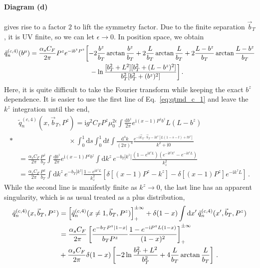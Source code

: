 \documentclass[11pt,a4paper]{article}
\DeclareRobustCommand{\eq}[1]{Eq.~\eqref{eq:#1}}
\newcommand{\df}{\mathrm{d}}
\newcommand{\img}{\mathrm{i}}
\newcommand{\eps}{\epsilon}
\newcommand{\nn}{\nonumber}
\newcommand{\as}{\alpha_s}
\newcommand{\bt}{\vec b_T}
\newcommand{\kt}{\vec k_T}
\newcommand{\plusinf}{_+^{\pm\infty}}
\begin{document}
\paragraph{Diagram (d)} gives rise to a factor $2$ to lift the symmetry factor.
Due to the finite separation $\bt$, it is UV finite, so we can let $\eps\to0$.
In position space, we obtain
\begin{align} \label{eq:qtmd_c_6}
 \tilde q_n^{(c,4)}(b^\mu) &
 = \frac{\as C_F}{2\pi} P^z e^{-\img b^z P^z}
   \biggl[ - 2\frac{b^z}{b_T} \arctan\frac{b^z}{b_T}
   + 2\frac{L}{b_T} \arctan\frac{L}{b_T}
   + 2 \frac{L - b^z}{b_T} \arctan\frac{L-b^z}{b_T}
   \nn\\&\hspace{3.2cm}
   - \ln\frac{[b_T^2 + L^2] [ b_T^2 + (L - b^z)^2]}{b_T^2 [b_T^2 + (b^z)^2]}
   \biggr]
\,.\end{align}
Here, it is quite difficult to take the Fourier transform while keeping the exact $b^z$ dependence.
It is easier to use the first line of \eq{qtmd_c_1} and leave the $k^z$ integration until the end,
\begin{align} \label{eq:qtmd_c_7}
 &\tilde q_n^{(c,4)}(x, \bt, P^z)
 = \img g^2 C_F P^z \mu_0^{2\eps} \int\frac{\df b^z}{2\pi} e^{\img (x-1)P^z b^z} L (L-b^z)
   \nn\\*&\hspace{3cm}\times
   \int_0^1 \df s \int_0^1 \df t \int\frac{\df^4 k}{(2\pi)^4}
   \frac{e^{-\img \kt \cdot \bt - \img k^z [L(1-s-t) + t b^z]}}{k^2 + \img 0}
\nn\\&
 = \frac{\as C_F}{2\pi} \frac{P^z}{b_T} \int\frac{\df b^z}{2\pi} e^{\img (x-1)P^z b^z}
   \int\df k^z \, e^{-b_T |k^z|} \frac{(1 - e^{\img k^z L})(e^{-\img b^z k^z} - e^{-\img k^z L})}{k_z^2}
\nn\\&
 = \frac{\as C_F}{2\pi} \frac{P^z}{b_T}
   \int\df k^z \, e^{-b_T |k^z|} \frac{1 - e^{\img k^z L}}{k_z^2}
   \left[ \delta[(x-1)P^z - k^z] - \delta[(x-1)P^z] e^{-\img k^z L} \right]
\,.\end{align}
While the second line is manifestly finite as $k^z\to0$, the last line has an apparent singularity,
which is as usual treated as a plus distribution,
\begin{align} \label{eq:qtmd_c_8}
 \tilde q_n^{(c,4)}(x, \bt, P^z) &
 = \Bigl[ \tilde q_n^{(c,4)}(x \ne 1, \bt, P^z) \Bigr]\plusinf
  + \delta(1-x) \int\df x'\,\tilde q_n^{(c,4)}(x', \bt, P^z)
\nn\\&
 = \frac{\as C_F}{2\pi} \left[ \frac{e^{-b_T P^z |1-x|}}{b_T P^z}
   \frac{1 - e^{- \img P^z L (1-x)}}{(1-x)^2} \right]\plusinf
   \nn\\&
 + \frac{\as C_F}{2\pi} \delta(1-x) \left[- 2 \ln\frac{b_T^2 + L^2}{b_T^2}
   + 4 \frac{L}{b_T} \arctan\frac{L}{b_T} \right]
\,.\end{align}
\end{document}

